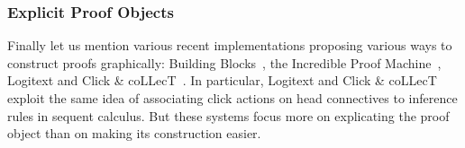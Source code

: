 \subsubsection*{Explicit Proof Objects}

Finally let us mention various recent implementations proposing various ways to
construct proofs graphically: Building Blocks~\cite{buildingblocks}, the
Incredible Proof Machine~\cite{blanchette-visual-2016},
Logitext and Click \&
coLLecT~\cite{clickcollect}. In particular, Logitext and Click \& coLLecT
exploit the same idea of associating click actions on head connectives to
inference rules in sequent calculus. But these systems focus more on explicating
the proof object than on making its construction easier.





